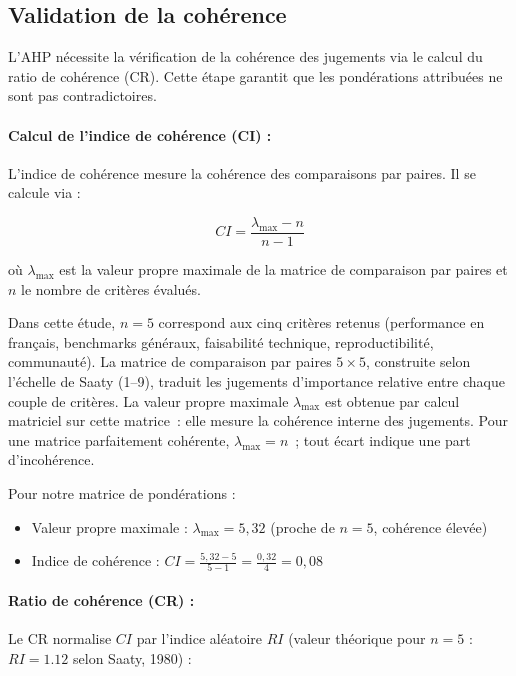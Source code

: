 \subsection{Validation de la cohérence}

L'AHP nécessite la vérification de la cohérence des jugements via le calcul du ratio de cohérence (CR). Cette étape garantit que les pondérations attribuées ne sont pas contradictoires.

\paragraph{Calcul de l'indice de cohérence (CI) :}

L'indice de cohérence mesure la cohérence des comparaisons par paires. Il se calcule via :

\[
CI = \frac{\lambda_{\text{max}} - n}{n - 1}
\]

où $\lambda_{\text{max}}$ est la valeur propre maximale de la matrice de comparaison par paires et $n$ le nombre de critères évalués.

Dans cette étude, $n = 5$ correspond aux cinq critères retenus (performance en français, benchmarks généraux, faisabilité technique, reproductibilité, communauté). La matrice de comparaison par paires $5 \times 5$, construite selon l'échelle de Saaty (1--9), traduit les jugements d'importance relative entre chaque couple de critères. La valeur propre maximale $\lambda_{\text{max}}$ est obtenue par calcul matriciel sur cette matrice~: elle mesure la cohérence interne des jugements. Pour une matrice parfaitement cohérente, $\lambda_{\text{max}} = n$~; tout écart indique une part d'incohérence.

Pour notre matrice de pondérations :

\begin{itemize}
    \item Valeur propre maximale : $\lambda_{\text{max}} = 5{,}32$ (proche de $n=5$, cohérence élevée)
    \item Indice de cohérence : $CI = \frac{5{,}32 - 5}{5 - 1} = \frac{0{,}32}{4} = 0{,}08$
\end{itemize}

\paragraph{Ratio de cohérence (CR) :}

Le CR normalise $CI$ par l'indice aléatoire $RI$ (valeur théorique pour $n=5$ : $RI = 1.12$ selon Saaty, 1980) :

